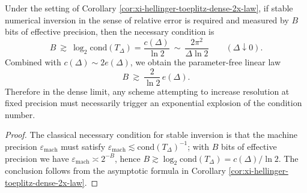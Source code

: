 \begin{corollary}\label{cor:xi-hellinger-toeplitz-bit-budget-linear-law}
Under the setting of Corollary \ref{cor:xi-hellinger-toeplitz-dense-2x-law}, if stable numerical inversion in the sense of relative error is required and measured by \(B\) bits of effective precision, then the necessary condition is
\[
\boxed{\;
B\ \gtrsim\ \log_2\mathrm{cond}(T_\Delta)=\frac{c(\Delta)}{\ln 2}
\ \sim\ \frac{2\pi^{2}}{\Delta\ln 2}\qquad(\Delta\downarrow0).\;}
\]
Combined with \(c(\Delta)\sim 2e(\Delta)\), we obtain the parameter-free linear law
\[
B\ \gtrsim\ \frac{2}{\ln 2}\,e(\Delta).
\]
Therefore in the dense limit, any scheme attempting to increase resolution at fixed precision must necessarily trigger an exponential explosion of the condition number.
\end{corollary}
\begin{proof}
The classical necessary condition for stable inversion is that the machine precision \(\varepsilon_{\mathrm{mach}}\) must satisfy \(\varepsilon_{\mathrm{mach}}\lesssim \mathrm{cond}(T_\Delta)^{-1}\);
with \(B\) bits of effective precision we have \(\varepsilon_{\mathrm{mach}}\asymp 2^{-B}\), hence \(B\gtrsim \log_2\mathrm{cond}(T_\Delta)=c(\Delta)/\ln 2\).
The conclusion follows from the asymptotic formula in Corollary \ref{cor:xi-hellinger-toeplitz-dense-2x-law}.
\end{proof}
